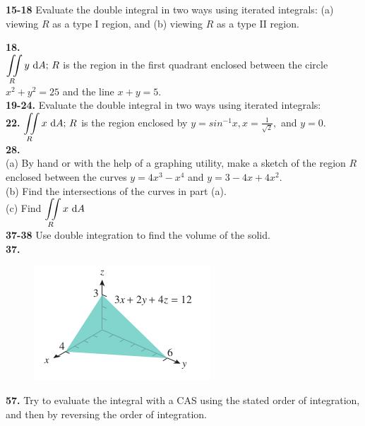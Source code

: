 \documentclass[a4paper,12pt]{article}
\begin{document}
\textbf{15-18} Evaluate the double integral in two ways using iterated integrals:
(a) viewing $R$ as a type I region, and (b) viewing $R$ as a type II region.

\textbf{18.} \\

$ {\displaystyle \iint \limits_R } \, y \, \, \text dA; \, R$ is the region in the first
quadrant enclosed between the circle $x^2 + y^2 = 25$ and the line $x + y = 5$. \\

\textbf{19-24.} Evaluate the double integral in two ways using iterated integrals: \\

\textbf{22.} $ {\displaystyle \iint \limits_R } \, x \, \, \text dA; \, R$ is the region
enclosed by $y = sin^{-1} x, x = \frac{1}{\sqrt{2}},$ and $y = 0$. \\

\textbf{28.} \\

(a) By hand or with the help of a graphing utility, make a sketch of the region
$R$ enclosed between the curves $y = 4x^3 - x^4$ and $y = 3 - 4x + 4x^2$. \\

(b) Find the intersections of the curves in part (a). \\

(c) Find $ {\displaystyle \iint \limits_R } \, x \, \, \text dA $ \\

\textbf{37-38} Use double integration to find the volume of the solid. \\

\textbf{37.} \\

\begin{figure}[h]
\includegraphics[scale=0.5]{img1.png}
\centering
\end{figure}

\textbf{57.} Try to evaluate the integral with a CAS using the stated order of
integration, and then by reversing the order of integration.\\
\end{document}
